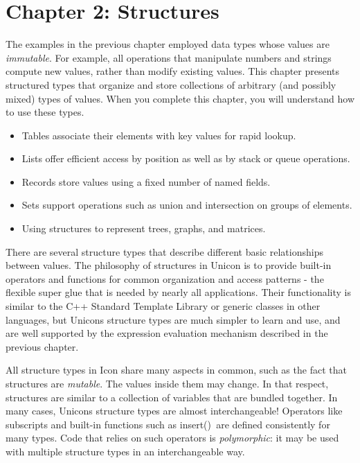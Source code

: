 \clearpage\section{Chapter 2: Structures}
The examples in the previous chapter employed data types whose values
are \textit{immutable}. For example, all operations that manipulate
numbers and strings compute new values, rather than modify existing
values. This chapter presents structured types that organize and store
collections of arbitrary (and possibly mixed) types of values. When you
complete this chapter, you will understand how to use these types.


\begin{itemize}
\item Tables associate their elements with key values for rapid lookup.
\item Lists offer efficient access by position as well as by
stack or queue operations.
\item Records store values using a fixed number of named fields.
\item Sets support operations such as union and intersection on groups
of elements.
\item Using structures to represent trees, graphs, and
matrices.
\end{itemize}
There are several structure types that describe different basic
relationships between values. The philosophy of structures in Unicon is
to provide built-in operators and functions for common organization and
access patterns - the flexible {\textquotedbl}super glue{\textquotedbl}
that is needed by nearly all applications. Their functionality is
similar to the C++ Standard Template Library or generic classes in
other languages, but Unicon{\textquotesingle}s structure types are much
simpler to learn and use, and are well supported by the expression
evaluation mechanism described in the previous chapter.

All structure types in Icon share many aspects in common, such as the
fact that structures are \textit{mutable}. The
values inside them may change. In that respect, structures are similar
to a collection of variables that are bundled together. In many cases,
Unicon{\textquotesingle}s structure types are almost interchangeable!
Operators like subscripts and built-in functions such as
\textsf{insert()}\texttt{ }are defined consistently for
many types. Code that relies on such operators is
\textit{polymorphic}: it may be used with multiple
structure types in an interchangeable way.


